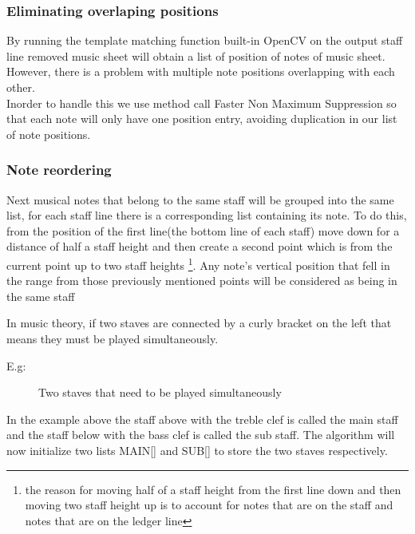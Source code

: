 \documentclass[a4paper,12pt]{report}
\begin{document}
\subsubsection{Eliminating overlaping positions}
By running the template matching function built-in OpenCV on the output staff
line removed music sheet will obtain a list of position of notes of music sheet.
However, there is a problem with multiple note positions overlapping with each
other.\\

Inorder to handle this we use  \textcite{Rosebrock} method call Faster Non
Maximum Suppression so that each note will only have one position entry, avoiding
duplication in our list of note positions.\\

\subsubsection{Note reordering} 

Next musical notes that belong to the same staff
will be grouped into the same list,  for each staff line there is a
corresponding list containing its note.  To do this, from the position of the
first line(the bottom line of each staff) move down for a distance of half a
staff height and then create a second point which is from the current point up
to two staff heights \footnote{the reason for moving half of a staff height from
the first line down and then moving two staff height up  is to account for notes
that are on the staff and notes that are on the ledger line}. Any note's
vertical position that fell in the range from those previously mentioned points
will be considered as being in the same staff \\

\clearpage

In music theory, if two staves are connected by a curly bracket on the left
that means they must be played simultaneously.

E.g:\\ 
\begin{figure}[h]
\caption{Two staves that need to be played simultaneously}
\label{fig:two staves}
\end{figure}


In the example above the staff above with the treble clef is called the main
staff and the staff below with the bass clef is called the sub staff. The
algorithm will now initialize two lists MAIN[] and SUB[] to store the two staves
respectively.\\
\end{document}
